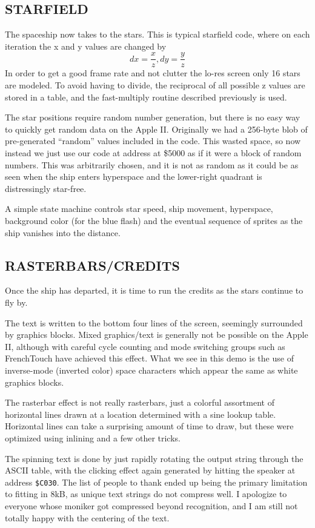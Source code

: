 \documentclass[twocolumn]{article}
\begin{document}
\subsection{STARFIELD}

The spaceship now takes to the stars.
This is typical starfield code, where on each iteration the x and y
values are changed by
	\[dx=\frac{x}{z}, dy=\frac{y}{z}\]
In order to get a good frame rate and not clutter the lo-res screen
only 16 stars are modeled.
To avoid having to divide, the reciprocal of all possible z values
are stored in a table, and the fast-multiply routine described
previously is used.

The star positions require random number generation, but there is no
easy way to quickly get random data on the Apple II.
Originally we had a 256-byte blob of pre-generated ``random'' values
included in the code.
This wasted space, so now instead we just use our code at address
at \$5000 as if it were a block of random numbers.
This was arbitrarily chosen, and it is not as random as it could be
as seen when the ship enters hyperspace and the lower-right quadrant
is distressingly star-free.

A simple state machine controls star speed, ship movement, hyperspace,
background color (for the blue flash) and the eventual sequence of sprites
as the ship vanishes into the distance.

\subsection{RASTERBARS/CREDITS}

Once the ship has departed, it is time to run the credits as the stars
continue to fly by.

The text is written to the bottom four lines of the screen, seemingly
surrounded by graphics blocks.
Mixed graphics/text is generally not be possible on the Apple II, although
with careful cycle counting and mode switching groups such as FrenchTouch
have achieved this effect.
What we see in this demo is the use of inverse-mode (inverted color)
space characters which appear the same as white graphics blocks.

The rasterbar effect is not really rasterbars, just a colorful assortment
of horizontal lines drawn at a location determined with a sine lookup table.
Horizontal lines can take a surprising amount of time to draw, but these
were optimized using inlining and a few other tricks.

The spinning text is done by just rapidly rotating the output string through
the ASCII table, with the clicking effect again generated
by hitting the speaker at address {\tt \$C030}.
The list of people to thank ended up being the primary limitation to
fitting in 8kB, as unique text strings do not compress well.  
I apologize to everyone whose moniker got compressed beyond recognition,
and I am still not totally happy with the centering of the text.
\end{document}
